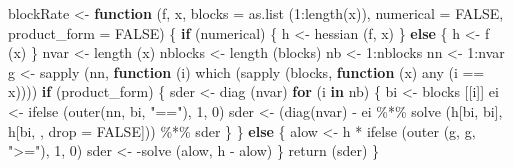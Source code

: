 \documentclass[
  12pt,
]{book}
\newenvironment{Shaded}{\begin{snugshade}}{\end{snugshade}}
\newcommand{\AttributeTok}[1]{\textcolor[rgb]{0.77,0.63,0.00}{#1}}
\newcommand{\ConstantTok}[1]{\textcolor[rgb]{0.00,0.00,0.00}{#1}}
\newcommand{\ControlFlowTok}[1]{\textcolor[rgb]{0.13,0.29,0.53}{\textbf{#1}}}
\newcommand{\DecValTok}[1]{\textcolor[rgb]{0.00,0.00,0.81}{#1}}
\newcommand{\FunctionTok}[1]{\textcolor[rgb]{0.00,0.00,0.00}{#1}}
\newcommand{\NormalTok}[1]{#1}
\newcommand{\OtherTok}[1]{\textcolor[rgb]{0.56,0.35,0.01}{#1}}
\newcommand{\SpecialCharTok}[1]{\textcolor[rgb]{0.00,0.00,0.00}{#1}}
\newcommand{\StringTok}[1]{\textcolor[rgb]{0.31,0.60,0.02}{#1}}
\begin{document}
\begin{Shaded}
\begin{Highlighting}[]
\NormalTok{blockRate }\OtherTok{\textless{}{-}}
  \ControlFlowTok{function}\NormalTok{ (f,}
\NormalTok{            x,}
            \AttributeTok{blocks =} \FunctionTok{as.list}\NormalTok{ (}\DecValTok{1}\SpecialCharTok{:}\FunctionTok{length}\NormalTok{(x)),}
            \AttributeTok{numerical =} \ConstantTok{FALSE}\NormalTok{,}
            \AttributeTok{product\_form =} \ConstantTok{FALSE}\NormalTok{) \{}
    \ControlFlowTok{if}\NormalTok{ (numerical) \{}
\NormalTok{      h }\OtherTok{\textless{}{-}} \FunctionTok{hessian}\NormalTok{ (f, x)}
\NormalTok{    \} }\ControlFlowTok{else}\NormalTok{ \{}
\NormalTok{      h }\OtherTok{\textless{}{-}} \FunctionTok{f}\NormalTok{ (x)}
\NormalTok{    \}}
\NormalTok{    nvar }\OtherTok{\textless{}{-}} \FunctionTok{length}\NormalTok{ (x)}
\NormalTok{    nblocks }\OtherTok{\textless{}{-}} \FunctionTok{length}\NormalTok{ (blocks)}
\NormalTok{    nb }\OtherTok{\textless{}{-}} \DecValTok{1}\SpecialCharTok{:}\NormalTok{nblocks}
\NormalTok{    nn }\OtherTok{\textless{}{-}} \DecValTok{1}\SpecialCharTok{:}\NormalTok{nvar}
\NormalTok{    g }\OtherTok{\textless{}{-}}
      \FunctionTok{sapply}\NormalTok{ (nn, }\ControlFlowTok{function}\NormalTok{ (i)}
        \FunctionTok{which}\NormalTok{ (}\FunctionTok{sapply}\NormalTok{ (blocks, }\ControlFlowTok{function}\NormalTok{ (x)}
          \FunctionTok{any}\NormalTok{ (i }\SpecialCharTok{==}\NormalTok{ x))))}
    \ControlFlowTok{if}\NormalTok{ (product\_form) \{}
\NormalTok{      sder }\OtherTok{\textless{}{-}} \FunctionTok{diag}\NormalTok{ (nvar)}
      \ControlFlowTok{for}\NormalTok{ (i }\ControlFlowTok{in}\NormalTok{ nb) \{}
\NormalTok{        bi }\OtherTok{\textless{}{-}}\NormalTok{ blocks [[i]]}
\NormalTok{        ei }\OtherTok{\textless{}{-}} \FunctionTok{ifelse}\NormalTok{ (}\FunctionTok{outer}\NormalTok{(nn, bi, }\StringTok{"=="}\NormalTok{), }\DecValTok{1}\NormalTok{, }\DecValTok{0}\NormalTok{)}
\NormalTok{        sder }\OtherTok{\textless{}{-}}
\NormalTok{          (}\FunctionTok{diag}\NormalTok{(nvar) }\SpecialCharTok{{-}}\NormalTok{ ei }\SpecialCharTok{\%*\%} \FunctionTok{solve}\NormalTok{ (h[bi, bi], h[bi, , }\AttributeTok{drop =} \ConstantTok{FALSE}\NormalTok{])) }\SpecialCharTok{\%*\%}\NormalTok{ sder}
\NormalTok{      \}}
\NormalTok{    \} }\ControlFlowTok{else}\NormalTok{ \{}
\NormalTok{      alow }\OtherTok{\textless{}{-}}\NormalTok{ h }\SpecialCharTok{*} \FunctionTok{ifelse}\NormalTok{ (}\FunctionTok{outer}\NormalTok{ (g, g, }\StringTok{"\textgreater{}="}\NormalTok{), }\DecValTok{1}\NormalTok{, }\DecValTok{0}\NormalTok{)}
\NormalTok{      sder }\OtherTok{\textless{}{-}} \SpecialCharTok{{-}}\FunctionTok{solve}\NormalTok{ (alow, h }\SpecialCharTok{{-}}\NormalTok{ alow)}
\NormalTok{    \}}
    \FunctionTok{return}\NormalTok{ (sder)}
\NormalTok{  \}}
\end{Highlighting}
\end{Shaded}
\end{document}
